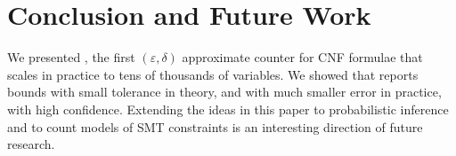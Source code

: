 \section{Conclusion and Future Work}\label{sec:discussion}
We presented {\approxMC}, the first $(\varepsilon, \delta)$
approximate counter for CNF formulae that scales in practice to tens
of thousands of variables.  We showed that {\approxMC} reports bounds
with small tolerance in theory, and with much smaller error in
practice, with high confidence. Extending the ideas in this paper to
probabilistic inference and to count models of SMT constraints is an interesting direction of future research. 
%

 
 
